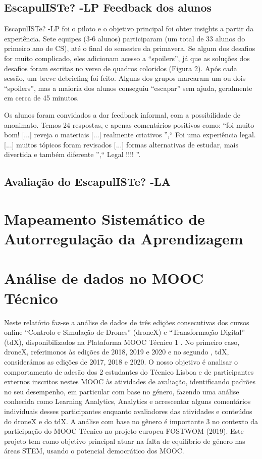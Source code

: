 \subsection{EscapulISTe? -LP Feedback dos alunos}

EscapulISTe? -LP foi o piloto e o objetivo principal foi obter insights a partir da experiência. Sete equipes (3-6 alunos) participaram (um total de 33 alunos do primeiro ano de CS), até o final do semestre da primavera. Se algum dos desafios for muito complicado, eles adicionam acesso a “spoilers”, já que as soluções dos desafios foram escritas no verso de quadros coloridos (Figura 2). Após cada sessão, um breve debriefing foi feito. Alguns dos grupos marcaram um ou dois “spoilers”, mas a maioria dos alunos conseguiu “escapar” sem ajuda, geralmente em cerca de 45 minutos.

Os alunos foram convidados a dar feedback informal, com a possibilidade de anonimato. Temos 24 respostas, e apenas comentários positivos como: “foi muito bom! [...] reveja o materiais [...] realmente criativos ”,“ Foi uma experiência legal. [...]
muitos tópicos foram revisados [...] formas alternativas de estudar,
mais divertida e também diferente ”,“ Legal !!!! ”.

\subsection{Avaliação do EscapulISTe? -LA}



\section{Mapeamento Sistemático de Autorregulação da Aprendizagem}

\section{Análise de dados no MOOC Técnico}

Neste relatório faz-se a análise de dados de três edições consecutivas dos cursos online “Controlo e Simulação de Drones” (droneX) e “Transformação Digital” (tdX), disponibilizados na Plataforma MOOC Técnico 1 . No primeiro caso, droneX, referimonos às edições de 2018, 2019 e 2020 e no segundo , tdX, considerámos as edições de 2017, 2018 e 2020. O nosso objetivo é analisar o comportamento de adesão dos 2
estudantes do Técnico Lisboa e de participantes externos inscritos nestes MOOC às atividades de avaliação, identificando padrões no seu desempenho, em particular com base no género, fazendo uma análise conhecida como Learning Analytics, Analytics e acrescentar alguns comentários individuais desses participantes enquanto avaliadores das atividades e conteúdos do droneX e do tdX. A análise com base no gênero é importante 3 no contexto da participação do MOOC Técnico no projeto
europeu FOSTWOM (2019). Este projeto tem como objetivo principal atuar na falta de equilíbrio de género nas áreas STEM, usando o potencial democrático dos MOOC.

